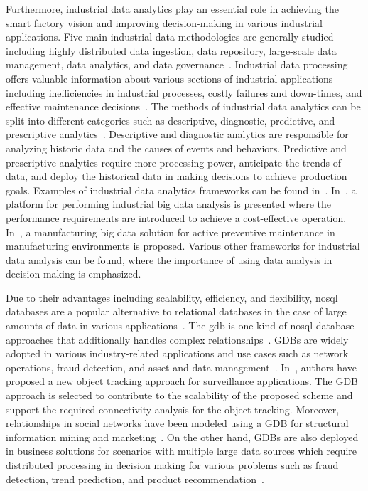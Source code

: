 Furthermore, industrial data analytics play an essential role in achieving the smart factory vision and improving decision-making in various industrial applications. Five main industrial data methodologies are generally studied including highly distributed data ingestion, data repository, large-scale data management, data analytics, and data governance~\cite{DBLP:journals/corr/abs-1807-01016}. Industrial data processing offers valuable information about various sections of industrial applications including inefficiencies in industrial processes, costly failures and down-times, and effective maintenance decisions~\cite{JLee-BigData, Raptis2019}.  The methods of industrial data analytics can be split into different categories such as descriptive, diagnostic, predictive, and prescriptive analytics~\cite{Dai2019}. Descriptive and diagnostic analytics are responsible for analyzing historic data and the causes of events and behaviors. Predictive and prescriptive analytics require more processing power, anticipate the trends of data, and deploy the historical data in making decisions to achieve production goals. Examples of industrial data analytics frameworks can be found in~\cite{GEBigData2019, Wan2017, Courtney2019, ABBBigData2019}. In~\cite{GEBigData2019}, a platform for performing industrial big data analysis is presented where the performance requirements are introduced to achieve a cost-effective operation. In~\cite{Prevent_7857790}, a manufacturing big data solution for active preventive maintenance in manufacturing environments is proposed. Various other frameworks for industrial data analysis can be found, where the importance of using data analysis in decision making is emphasized.

Due to their advantages including scalability, efficiency, and flexibility, \gls{nosql} databases are a popular alternative to relational databases in the case of large amounts of data in various applications~\cite{doi:10.1108/17440081311316398}. The \gls{gdb} is one kind of \gls{nosql} database approaches that additionally handles complex relationships~\cite{8123475}. GDBs are widely adopted in various industry-related applications and use cases such as network operations, fraud detection, and asset and data management~\cite{top5}. In~\cite{8721634}, authors have proposed  a new object tracking approach for surveillance applications. The GDB approach is selected to contribute to the scalability of the proposed scheme and support the required connectivity analysis for the object tracking. Moreover, relationships in social networks have been modeled using a GDB for structural information mining and marketing~\cite{Gomez-Rodriguez:2012:IND:2086737.2086741}. On the other hand, GDBs are also deployed in business solutions for scenarios with multiple large data sources which require distributed processing in decision making for various problems such as fraud detection, trend prediction, and product recommendation~\cite{Skhiri2013}. 


